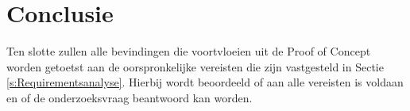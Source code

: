 \section{Conclusie}
Ten slotte zullen alle bevindingen die voortvloeien uit de Proof of Concept worden getoetst aan de oorspronkelijke vereisten die zijn vastgesteld in Sectie \ref{s:Requirementsanalyse}. Hierbij wordt beoordeeld of aan alle vereisten is voldaan en of de onderzoeksvraag beantwoord kan worden.

